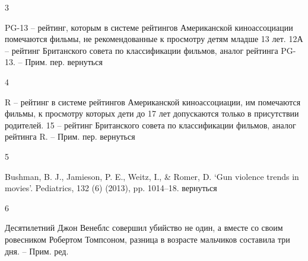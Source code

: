 3

PG-13 – рейтинг, которым в системе рейтингов Американской киноассоциации помечаются фильмы, не рекомендованные к просмотру детям младше 13 лет. 12А – рейтинг Британского совета по классификации фильмов, аналог рейтинга PG-13. – Прим. пер.
вернуться

4

R – рейтинг в системе рейтингов Американской киноассоциации, им помечаются фильмы, к просмотру которых дети до 17 лет допускаются только в присутствии родителей. 15 – рейтинг Британского совета по классификации фильмов, аналог рейтинга R. – Прим. пер.
вернуться

5

Bushman, B. J., Jamieson, P. E., Weitz, I., & Romer, D. ‘Gun violence trends in movies’. Pediatrics, 132 (6) (2013), pp. 1014–18.
вернуться

6

Десятилетний Джон Венеблс совершил убийство не один, а вместе со своим ровесником Робертом Томпсоном, разница в возрасте мальчиков составила три дня. – Прим. ред.

